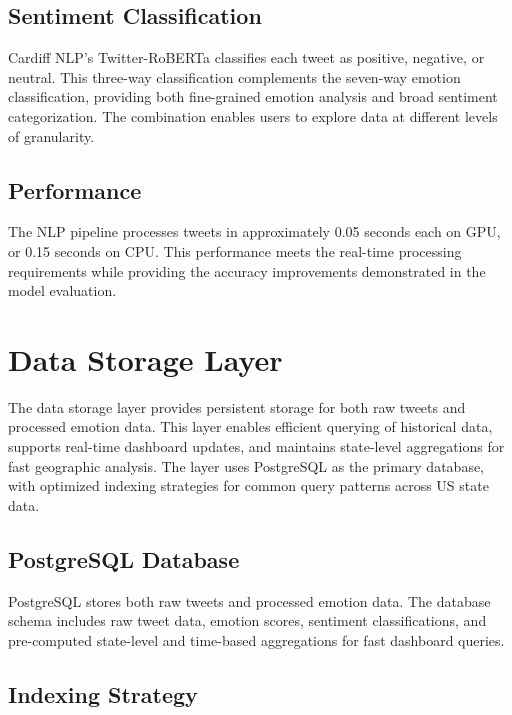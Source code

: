 \subsection{Sentiment Classification}

Cardiff NLP's Twitter-RoBERTa classifies each tweet as positive, negative, or neutral. This three-way classification complements the seven-way emotion classification, providing both fine-grained emotion analysis and broad sentiment categorization. The combination enables users to explore data at different levels of granularity.

\subsection{Performance}

The NLP pipeline processes tweets in approximately 0.05 seconds each on GPU, or 0.15 seconds on CPU. This performance meets the real-time processing requirements while providing the accuracy improvements demonstrated in the model evaluation.


\section{Data Storage Layer}

The data storage layer provides persistent storage for both raw tweets and processed emotion data. This layer enables efficient querying of historical data, supports real-time dashboard updates, and maintains state-level aggregations for fast geographic analysis. The layer uses PostgreSQL as the primary database, with optimized indexing strategies for common query patterns across US state data.

\subsection{PostgreSQL Database}

PostgreSQL stores both raw tweets and processed emotion data. The database schema includes raw tweet data, emotion scores, sentiment classifications, and pre-computed state-level and time-based aggregations for fast dashboard queries.

\subsection{Indexing Strategy}

